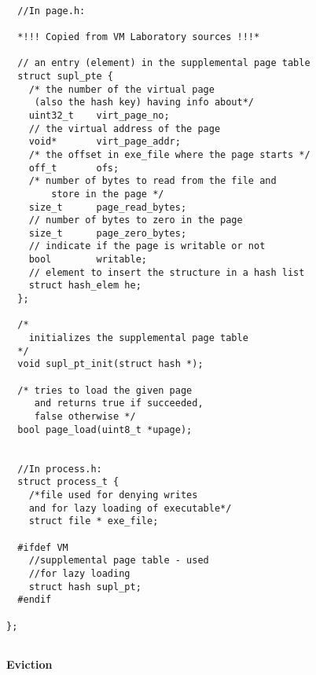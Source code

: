 \begin{lstlisting}
 
  //In page.h:
  
  *!!! Copied from VM Laboratory sources !!!*

  // an entry (element) in the supplemental page table
  struct supl_pte {					
	/* the number of the virtual page 
	 (also the hash key) having info about*/
	uint32_t	virt_page_no; 			
	// the virtual address of the page
	void*		virt_page_addr;			
	/* the offset in exe_file where the page starts */
	off_t 		ofs;				
	/* number of bytes to read from the file and
	    store in the page */
	size_t 		page_read_bytes;		
	// number of bytes to zero in the page
	size_t 		page_zero_bytes; 		
	// indicate if the page is writable or not
	bool		writable;		
	// element to insert the structure in a hash list
	struct hash_elem he;				
  };

  /*
    initializes the supplemental page table
  */
  void supl_pt_init(struct hash *);
  
  /* tries to load the given page
     and returns true if succeeded,
     false otherwise */
  bool page_load(uint8_t *upage);


  //In process.h:
  struct process_t {
    /*file used for denying writes 
    and for lazy loading of executable*/
    struct file * exe_file;

  #ifdef VM
    //supplemental page table - used
    //for lazy loading
    struct hash supl_pt;				
  #endif

};
  
\end{lstlisting}

\textbf{Eviction}


